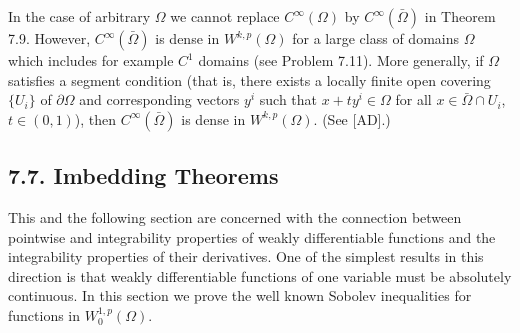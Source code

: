 In the case of arbitrary $\Omega$ we cannot replace $C^\infty(\Omega)$ by $C^\infty(\bar{\Omega})$ in Theorem 7.9. However, $C^\infty(\bar{\Omega})$ is dense in $W^{k,p}(\Omega)$ for a large class of domains $\Omega$ which includes for example $C^1$ domains (see Problem 7.11). More generally, if $\Omega$ satisfies a segment condition (that is, there exists a locally finite open covering $\{U_i\}$ of $\partial\Omega$ and corresponding vectors $y^i$ such that $x+ty^i \in \Omega$ for all $x \in \bar{\Omega}\cap U_i$, $t \in (0,1)$), then $C^\infty(\bar{\Omega})$ is dense in $W^{k,p}(\Omega)$. (See [AD].)

\subsection*{7.7. Imbedding Theorems}

This and the following section are concerned with the connection between pointwise and integrability properties of weakly differentiable functions and the integrability properties of their derivatives. One of the simplest results in this direction is that weakly differentiable functions of one variable must be absolutely continuous. In this section we prove the well known Sobolev inequalities for functions in $W^{1,p}_0(\Omega)$.

